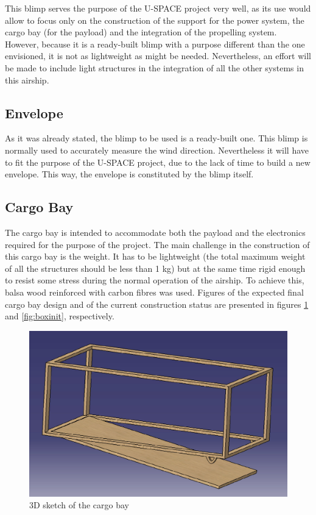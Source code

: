 This blimp serves the purpose of the U-SPACE project very well, as its use would allow to focus only on the construction of the support for the power system, the cargo bay (for the payload) and the integration of the propelling system. However, because it is a ready-built blimp with a purpose different than the one envisioned, it is not as lightweight as might be needed. Nevertheless, an effort will be made to include light structures in the integration of all the other systems in this airship.

\subsection{Envelope}

As it was already stated, the blimp to be used is a ready-built one. This blimp is normally used to accurately measure the wind direction. Nevertheless it will have to fit the purpose of the U-SPACE project, due to the lack of time to build a new envelope. This way, the envelope is constituted by the blimp itself.  

\subsection{Cargo Bay}

The cargo bay is intended to accommodate both the payload and the electronics required for the purpose of the project. The main challenge in the construction of this cargo bay is the weight. It has to be lightweight (the total maximum weight of all the structures should be less than 1 kg) but at the same time rigid enough to resist some stress during the normal operation of the airship. To achieve this, balsa wood reinforced with carbon fibres was used. Figures of the expected final cargo bay design and of the current construction status are presented in figures \ref{fig:box} and \ref{fig:boxinit}, respectively. 

\begin{figure}[bht]
\centering
\includegraphics[scale=0.5]{figures/box.png}
\caption{3D sketch of the cargo bay} 
\label{fig:box}
\end{figure}

